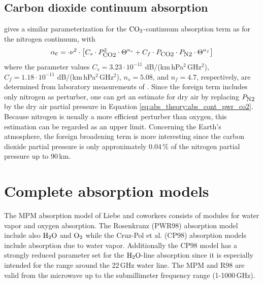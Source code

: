\subsection{Carbon dioxide continuum absorption}
\label{levelc:co2cont}
\citet{pwr:93} gives a similar parameterization for the $\mbox{CO}_2$-continuum 
absorption term as for the nitrogen continuum, with 
\begin{equation}
  \label{eq:abs_theory:abs_cont_pwr_co2}
    \alpha_{\mbox{\small c}} =   \cdot \nu^2 \cdot  
                \left[ C_s \cdot P_{\mbox{\rm \small CO2}}^2           \cdot \Theta^{n_s} +
                       C_f \cdot P_{\mbox{\rm \small CO2}}  \cdot P_{\mbox{\rm \small N2}} \cdot \Theta^{n_f} \right]
\end{equation}
where the parameter values $C_s = 3.23\cdot 10^{-11}$
dB/(km\,hPa$^2$\,GHz$^2$), $C_f = 1.18\cdot 10^{-11}$
dB/(km\,hPa$^2$\,GHz$^2$), $n_s=5.08$, and $n_f=4.7$, respectively, 
are determined from laboratory measurements of \citet{ho:66,dagg:75}. 
Since the foreign term
includes only nitrogen as perturber, one can get an estimate for dry
air by replacing $P_{\mbox{\rm \small N2}}$ by the dry air partial pressure in
Equation \ref{eq:abs_theory:abs_cont_pwr_co2}. Because nitrogen is usually a more
efficient perturber than oxygen, this estimation can be regarded as an
upper limit. Concerning the Earth's atmosphere, the foreign broadening
term is more interesting since the carbon dioxide partial pressure is
only approximately 0.04\,\% of the nitrogen partial pressure up to
90\,km.






\section{Complete absorption models}
\label{sec:abs_theory:CompAbsMod}
The MPM absorption model of Liebe and coworkers consists of modules for 
water vapor and oxygen absorption. The Rosenkranz (PWR98) absorption 
model include also $\mbox{H}_2\mbox{O}$ and $\mbox{O}_2$ while the Cruz-Pol et al. (CP98) absorption 
models include absorption due to water vapor. Additionally 
the CP98 model has a strongly reduced parameter set for the $\mbox{H}_2\mbox{O}$-line 
absorption since it is especially intended for the range around the 
22\,GHz water line. The MPM and R98 are valid from the microwave 
up to the submillimeter frequency range (1-1000\,GHz).


